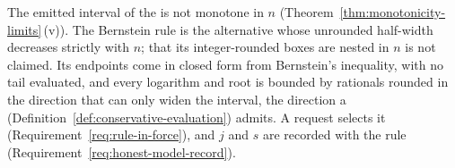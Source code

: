 
The emitted interval of the
 is not monotone in $n$
(Theorem~\ref{thm:monotonicity-limits}\,(v)). The Bernstein rule is the alternative whose
unrounded half-width decreases strictly with $n$; that its integer-rounded
boxes are nested in $n$ is not claimed. Its endpoints come in closed form
from Bernstein's inequality, with no tail evaluated, and every
logarithm and root is bounded by rationals rounded in the direction that can
only widen the interval, the direction a 
(Definition~\ref{def:conservative-evaluation}) admits.
A request selects it (Requirement~\ref{req:rule-in-force}), and $j$ and $s$
are recorded with the rule (Requirement~\ref{req:honest-model-record}).

